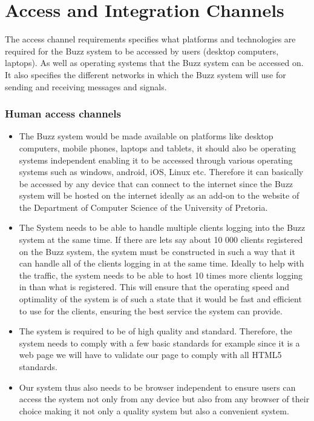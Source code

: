 \documentclass[a4paper]{article}
\begin{document}
\section{Access and Integration Channels}
The access channel requirements specifies what platforms and technologies are required for the Buzz system to be accessed by users (desktop computers, laptops). As well as operating systems that the Buzz system can be accessed on. It also specifies the different networks in which the Buzz system will use for sending and receiving messages and signals.

\subsubsection{Human access channels }
\begin{itemize}
\item The Buzz system would be made available on platforms like desktop computers, mobile phones, laptops and tablets, it should also be operating systems independent enabling it to be accessed through various operating systems such as  windows, android, iOS, Linux etc. Therefore it can basically be accessed by any device that can connect to the internet since the Buzz system will be hosted on the internet ideally as an add-on to the website of the Department of Computer Science of the University of Pretoria. 
\item The System needs to be able to handle multiple clients logging into the Buzz system at the same time. If there are lets say about 10 000 clients registered on the Buzz system, the system must be constructed in such a way that it can handle all of the clients logging in at the same time. Ideally to help with the traffic, the system needs to be able to host 10 times more clients logging in than what is registered. This will ensure that the operating speed and optimality of the system is of such a state that it would be fast and efficient to use for the clients, ensuring the best service the system can provide.
\item The system is required to be of high quality and standard. Therefore, the system needs to comply with a few basic standards for example  since it is a web page we will have to validate our page to comply with all HTML5 standards. 
\item Our system thus also needs to be browser independent to ensure users can access the system not only from any device but also from any browser of their choice making it not only a quality system but also a convenient system.


\end{itemize}
\end{document}
